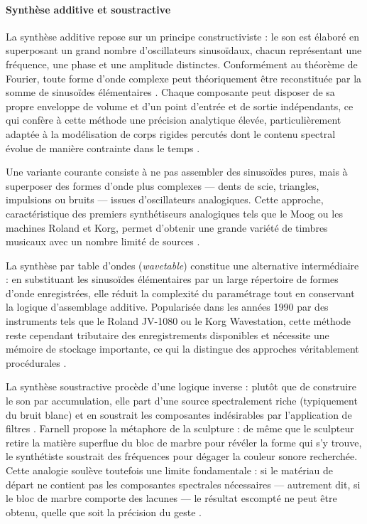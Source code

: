 ﻿\documentclass[12pt]{article}
\begin{document}
\paragraph{Synthèse additive et soustractive}

\leavevmode

La synthèse additive repose sur un principe constructiviste : le son est élaboré en superposant un grand nombre d'oscillateurs sinusoïdaux, chacun représentant une fréquence, une phase et une amplitude distinctes. Conformément au théorème de Fourier, toute forme d'onde complexe peut théoriquement être reconstituée par la somme de sinusoïdes élémentaires \parencite{farnell_designing_2010}.
Chaque composante peut disposer de sa propre enveloppe de volume et d'un point d'entrée et de sortie indépendants, ce qui confère à cette méthode une précision analytique élevée, particulièrement adaptée à la modélisation de corps rigides percutés dont le contenu spectral évolue de manière
contrainte dans le temps \parencite{farnell_designing_2010}. 

Une variante courante consiste à ne pas assembler des sinusoïdes pures, mais à superposer des formes d'onde plus complexes --- dents de scie, triangles, impulsions ou bruits --- issues d'oscillateurs analogiques. Cette approche, caractéristique des premiers synthétiseurs analogiques tels que le Moog ou les machines Roland et Korg, permet d'obtenir une grande variété de timbres musicaux avec un nombre limité de sources \parencite{farnell_designing_2010}.
 
La synthèse par table d'ondes (\textit{wavetable}) constitue une alternative intermédiaire : en substituant les sinusoïdes élémentaires par un large répertoire de formes d'onde enregistrées, elle réduit la complexité du paramétrage tout en conservant la logique d'assemblage additive. Popularisée dans les années 1990 par des instruments tels que le Roland JV-1080 ou le Korg Wavestation, cette méthode reste cependant tributaire des enregistrements disponibles et nécessite une mémoire de stockage importante, ce qui la distingue des approches véritablement procédurales \parencite{farnell_designing_2010}.
 
La synthèse soustractive procède d'une logique inverse : plutôt que de construire le son par accumulation, elle part d'une source spectralement riche (typiquement du bruit blanc) et en soustrait les composantes indésirables par l'application de filtres \parencite{farnell_designing_2010}. Farnell propose la métaphore de la sculpture : de même que le sculpteur retire la matière superflue du bloc de marbre pour révéler la forme qui s'y trouve, le synthétiste soustrait des fréquences pour dégager la couleur
sonore recherchée. Cette analogie soulève toutefois une limite fondamentale : si le matériau
de départ ne contient pas les composantes spectrales nécessaires --- autrement dit, si le bloc de marbre comporte des lacunes --- le résultat escompté ne peut être obtenu, quelle que soit la précision du geste \parencite{farnell_designing_2010}.
 
\end{document}
